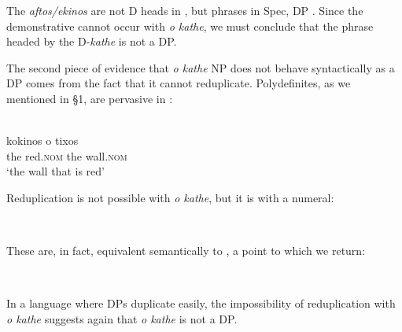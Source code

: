 \documentclass[output=paper,
modfonts
]{langscibook}
\begin{document}
The  \textit{aftos/ekinos} are not D heads in , but phrases in {\ob}Spec, DP{\cb} \citep{stavrou-horrocks1989}. Since the demonstrative cannot occur with \textit{o kathe}, we must conclude that the phrase headed by the D-\textit{kathe} is not a DP.

The second piece of evidence that \textit{o kathe} NP does not behave syntactically as a DP comes from the fact that it cannot reduplicate. Polydefinites, as we mentioned in \S1, are pervasive in  \citep[see][]{AlexiadouWilder1998b, CamposStravrou2004, kolliakou2004, ioannidou-dendikken2006, lekakou-szendroi2007}:

\ea\label{ex:etxeberria:28} \\
 {kokinos} {o} {tixos}\\
the red.\textsc{nom} the wall.\textsc{nom}\\
\glt `the wall that is red'
\z

Reduplication is not possible with \textit{o kathe}, but it is with a numeral:

\ea\label{ex:etxeberria:29} \\
\z
\z

These are, in fact, equivalent semantically to , a point to which we return:

\ea\label{ex:etxeberria:30} \\
\z
\z

In a language where DPs duplicate easily, the impossibility of reduplication with \textit{o kathe} suggests again that \textit{o kathe} is not a DP.
\end{document}
